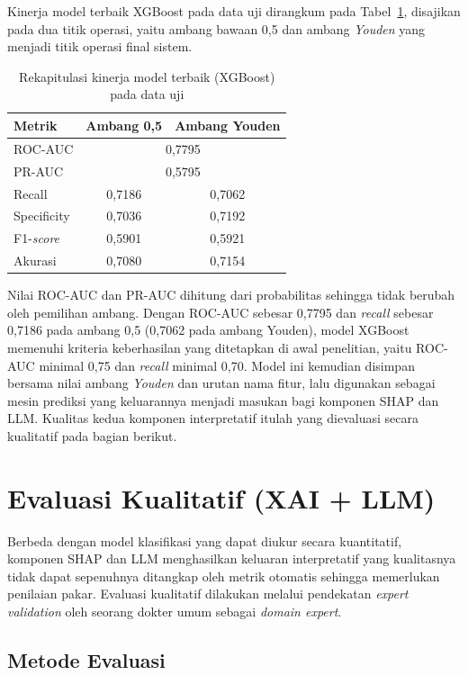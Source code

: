 Kinerja model terbaik XGBoost pada data uji dirangkum pada
Tabel~\ref{tab:rekap-ml}, disajikan pada dua titik operasi, yaitu ambang bawaan
0,5 dan ambang \emph{Youden} yang menjadi titik operasi final sistem.

\begin{table}[htbp]
\centering
\caption{Rekapitulasi kinerja model terbaik (XGBoost) pada data uji}
\label{tab:rekap-ml}
\begin{tabular}{@{}lcc@{}}
\toprule
\textbf{Metrik} & \textbf{Ambang 0,5} & \textbf{Ambang Youden} \\
\midrule
ROC-AUC       & \multicolumn{2}{c}{0,7795} \\
PR-AUC        & \multicolumn{2}{c}{0,5795} \\
Recall        & 0,7186 & 0,7062 \\
Specificity   & 0,7036 & 0,7192 \\
F1-\emph{score} & 0,5901 & 0,5921 \\
Akurasi       & 0,7080 & 0,7154 \\
\bottomrule
\end{tabular}
\end{table}

Nilai ROC-AUC dan PR-AUC dihitung dari probabilitas sehingga tidak berubah oleh
pemilihan ambang. Dengan ROC-AUC sebesar 0,7795 dan \emph{recall} sebesar 0,7186
pada ambang 0,5 (0,7062 pada ambang Youden), model XGBoost memenuhi kriteria
keberhasilan yang ditetapkan di awal penelitian, yaitu ROC-AUC minimal 0,75 dan
\emph{recall} minimal 0,70. Model ini kemudian disimpan bersama nilai ambang
\emph{Youden} dan urutan nama fitur, lalu digunakan sebagai mesin prediksi yang
keluarannya menjadi masukan bagi komponen SHAP dan LLM. Kualitas kedua komponen
interpretatif itulah yang dievaluasi secara kualitatif pada bagian berikut.

\section{Evaluasi Kualitatif (XAI + LLM)}
\label{sec:evaluasi-kualitatif}
Berbeda dengan model klasifikasi yang dapat diukur secara kuantitatif, komponen
SHAP dan LLM menghasilkan keluaran interpretatif yang kualitasnya tidak dapat
sepenuhnya ditangkap oleh metrik otomatis sehingga memerlukan penilaian pakar.
Evaluasi kualitatif dilakukan melalui pendekatan \emph{expert validation} oleh
seorang dokter umum sebagai \emph{domain expert}.

\subsection{Metode Evaluasi}
\label{sec:metode-evaluasi}

